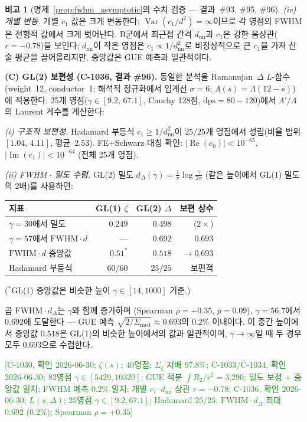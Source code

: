 \documentclass[11pt, a4paper]{article}
\theoremstyle{definition}
\newtheorem{remark}{비고}[section]
\theoremstyle{plain}
\begin{document}
\begin{remark}[명제~\ref{prop:fwhm_asymptotic}의 수치 검증 --- 결과~\#93, \#95, \#96]
\smallskip\noindent
\emph{(iv) 개별 변동.}
개별 $c_1$ 값은 크게 변동한다:
$\operatorname{Var}(c_1/d^2) = \infty$이므로 각 영점의 FWHM은
전형적 값에서 크게 벗어난다.
B군에서 최근접 간격 $d_{\mathrm{nn}}$과 $c_1$은
강한 음상관($r = -0.78$)을 보인다;
$d_{\mathrm{nn}}$이 작은 영점은 $c_1 \propto 1/d_{\mathrm{nn}}^2$로
비정상적으로 큰 $c_1$을 가져 산술 평균을 끌어올리지만,
중앙값은 GUE 예측과 일관적이다.

\smallskip\noindent
\textbf{(C) GL(2) 보편성 (C-1036, 결과 \#96).}
동일한 분석을 Ramanujan~$\Delta$ $L$-함수
(weight~12, conductor~1; 해석적 정규화에서 임계선 $\sigma=6$;
$\Lambda(s) = \Lambda(12{-}s)$)에 적용한다.
25개 영점($\gamma \in [9.2,\,67.1]$, Cauchy 128점,
$\mathrm{dps}=80{-}120$)에서 $\Lambda'/\Lambda$의 Laurent 계수를 계산한다:

\smallskip\noindent
\emph{(i) 구조적 보편성.}
Hadamard 부등식 $c_1 \ge 1/d_{\mathrm{nn}}^2$이
$25/25$개 영점에서 성립(비율 범위 $[1.04,\,4.11]$, 평균~$2.53$).
FE$+$Schwarz 대칭 확인:
$|\operatorname{Re}(c_0)| < 10^{-65}$,
$|\operatorname{Im}(c_1)| < 10^{-64}$ (전체 25개 영점).

\smallskip\noindent
\emph{(ii) FWHM$\,\cdot\,$밀도 수렴.}
GL(2) 밀도 $d_\Delta(\gamma) = \tfrac{1}{\pi}\log\!\tfrac{\gamma}{2\pi}$
(같은 높이에서 GL(1) 밀도의 2배)를 사용하면:
\begin{center}
\small
\begin{tabular}{@{}lrrr@{}}
\toprule
지표 & GL(1) $\zeta$ & GL(2) $\Delta$ & 보편 상수 \\
\midrule
$\gamma{=}30$에서 밀도 & $0.249$ & $0.498$ & ($2\times$) \\
$\gamma{=}57$에서 $\mathrm{FWHM}\!\cdot\!d$ & --- & $0.692$ & $0.693$ \\
$\mathrm{FWHM}\!\cdot\!d$ 중앙값 & $0.51^*$ & $0.518$ & $\to 0.693$ \\
Hadamard 부등식 & $60/60$ & $25/25$ & 보편적 \\
\bottomrule
\end{tabular}
\end{center}
\noindent
($^*$GL(1) 중앙값은 비슷한 높이 $\gamma \in [14,\!1000]$ 기준.)

\noindent
곱 $\mathrm{FWHM}\!\cdot\!d_\Delta$는 $\gamma$와 함께 증가하며
(Spearman $\rho = +0.35$, $p = 0.09$),
$\gamma{=}56.7$에서 $0.692$에 도달한다 ---
GUE 예측 $\sqrt{2/\Sigma_{\mathrm{med}}} \approx 0.693$의
$0.2\%$ 이내이다.
이 중간 높이에서 중앙값 $0.518$은
GL(1)의 비슷한 높이에서의 값과 일관적이며,
$\gamma \to \infty$일 때 두 경우 모두 $0.693$으로 수렴한다.

\textcolor{ForestGreen}{[C-1030, 확인 2026-06-30; $\zeta(s)$;
40영점; $\Sigma_\zeta$ 지배 $97.8\%$;
C-1033/C-1034, 확인 2026-06-30;
$82$영점 $\gamma \in [5429,\!10320]$;
GUE 적분 $\int R_2/r^2 = 3.290$;
밀도 보정 $+$ 중앙값 일치;
FWHM 예측 $0.2\%$ 일치;
개별 $c_1$--$d_{\mathrm{nn}}$ 상관 $r{=}{-}0.78$;
C-1036, 확인 2026-06-30; $L(s,\Delta)$;
$25$영점 $\gamma \in [9.2,\!67.1]$;
Hadamard $25/25$; $\mathrm{FWHM}\!\cdot\!d_\Delta$ 최대 $0.692$ ($0.2\%$);
Spearman $\rho{=}{+}0.35$]}
\end{remark}
\end{document}
